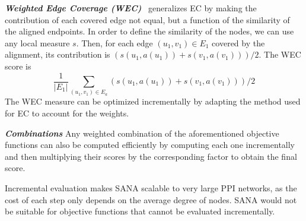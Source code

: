 \documentclass{bioinfo}
\begin{document}
\begin{methods}
\emph{\textbf{Weighted Edge Coverage (WEC)}}~\citep{WAVE} generalizes EC by making the contribution of each covered edge not equal, but a function of the similarity of the aligned endpoints. In order to define the similarity of the nodes, we can use any local measure $s$. Then, for each edge $(u_1,v_1)\in E_1$ covered by the alignment, its contribution is $\left(s(u_1,a(u_1))+s(v_1,a(v_1))\right)/2$. The WEC score is
$$\frac{1}{|E_1|}\sum_{(u_1,v_1)\in E_a} \left(s(u_1,a(u_1))+s(v_1,a(v_1))\right)/2$$
The WEC measure can be optimized incrementally by adapting the method used for EC to account for the weights.

\emph{\textbf{Combinations}} Any weighted combination of the aforementioned objective functions can also be computed efficiently by computing each one incrementally and then multiplying their scores by the corresponding factor to obtain the final score.

Incremental evaluation makes SANA scalable to very large PPI networks, as the cost of each step only depends on the average degree of nodes. SANA would not be suitable for objective functions that cannot be evaluated incrementally.



\end{methods}
\end{document}
